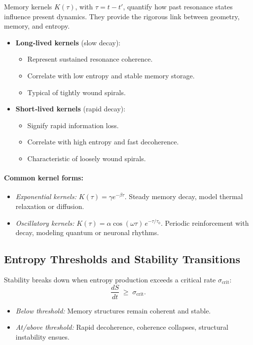 Memory kernels \(K(\tau)\), with \(\tau = t - t'\), quantify how past resonance states influence present dynamics.  They provide the rigorous link between geometry, memory, and entropy.

\begin{itemize}
  \item \textbf{Long‐lived kernels} (slow decay):
    \begin{itemize}
      \item Represent sustained resonance coherence.
      \item Correlate with low entropy and stable memory storage.
      \item Typical of tightly wound spirals.
    \end{itemize}
  \item \textbf{Short‐lived kernels} (rapid decay):
    \begin{itemize}
      \item Signify rapid information loss.
      \item Correlate with high entropy and fast decoherence.
      \item Characteristic of loosely wound spirals.
    \end{itemize}
\end{itemize}

\paragraph{Common kernel forms:}
\begin{itemize}
  \item \emph{Exponential kernels:} 
    \(K(\tau)=\gamma e^{-\beta\tau}\).  
    Steady memory decay, model thermal relaxation or diffusion.
  \item \emph{Oscillatory kernels:} 
    \(K(\tau)=\alpha\cos(\omega\tau)\,e^{-\tau/\tau_{0}}\).  
    Periodic reinforcement with decay, modeling quantum or neuronal rhythms.
\end{itemize}

\subsection{Entropy Thresholds and Stability Transitions}

Stability breaks down when entropy production exceeds a critical rate \(\sigma_{\mathrm{crit}}\):
\[
  \frac{dS}{dt}\;\ge\;\sigma_{\mathrm{crit}}.
\]
\begin{itemize}
  \item \emph{Below threshold:} Memory structures remain coherent and stable.
  \item \emph{At/above threshold:} Rapid decoherence, coherence collapses, structural instability ensues.
\end{itemize}

